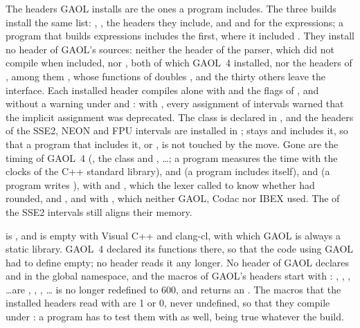 \documentclass[12pt,a4paper,twoside,openright]{book}
\begin{document}
\medskip
The headers GAOL installs are the ones a program includes.\newinvfive{} The
three builds install the same list: , , the
headers they include, and  and
 for the expressions; a program that
builds expressions includes the first, where it included
. They install no header of GAOL's sources:
neither the header of the parser, which did not compile when included, nor
, both of which GAOL~4 installed, nor the
headers of , among them , whose
functions of doubles ,  and the thirty others
leave the interface. Each installed header compiles alone with
 and the flags of , and without a warning
under  and : with
, every assignment of intervals warned that the implicit
assignment was deprecated. The class  is declared in
, and the headers of the SSE2, NEON
and FPU intervals are installed in ;
 stays and includes it, so that a program that
includes it, or , is not touched by the move. Gone are the
timing of GAOL~4 (, the class 
and , \ldots; a program measures the
time with the clocks of the C++ standard library),
 and  (a program
includes  itself),  and
 (a program writes ),
 with  and
, which the lexer called to know whether
 had rounded,  and
, and  with
, which neither GAOL, Codac nor IBEX used.
The  of the SSE2 intervals still aligns their memory.

\medskip
{} is , and is empty with Visual
C++ and clang-cl, with which GAOL is always a static library.\newinvfive{}
GAOL~4 declared its functions  there, so that
the code using GAOL had to define  empty; no
header reads it any longer. No header of GAOL declares  and
 in the global namespace, and the macros of GAOL's headers
start with : , , ,
\ldots are ,
, , \ldots
{} is no longer redefined to 600, and
 returns an . The macros
that the installed headers read with  are 1 or 0, never undefined,
so that they compile under : a program has to test
them with  as well,  being
true whatever the build.
\end{document}
